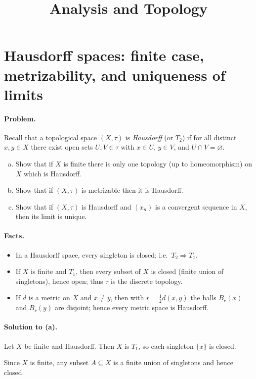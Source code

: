\documentclass[12pt,a4paper]{article}
\title{\Large Analysis and Topology}
\author{}
\date{}
\theoremstyle{plain}
\theoremstyle{definition}
\theoremstyle{remark}
\theoremstyle{remark}
\begin{document}
	
	
	\section*{Hausdorff spaces: finite case, metrizability, and uniqueness of limits}
	
	\paragraph{Problem.}
	Recall that a topological space $(X,\tau)$ is \emph{Hausdorff} (or $T_2$) if for all distinct $x,y\in X$
	there exist open sets $U,V\in\tau$ with $x\in U$, $y\in V$, and $U\cap V=\varnothing$.
	\begin{enumerate}[(a)]
		\item Show that if $X$ is finite there is only one topology (up to homeomorphism) on $X$ which is Hausdorff.
		\item Show that if $(X,\tau)$ is metrizable then it is Hausdorff.
		\item Show that if $(X,\tau)$ is Hausdorff and $(x_n)$ is a convergent sequence in $X$, then its limit is unique.
	\end{enumerate}
	
	\paragraph{Facts.}
	\begin{itemize}
		\item In a Hausdorff space, every singleton is closed; i.e.\ $T_2 \Rightarrow T_1$.
		\item If $X$ is finite and $T_1$, then every subset of $X$ is closed (finite union of singletons), hence open; thus $\tau$ is the discrete topology.
		\item If $d$ is a metric on $X$ and $x\neq y$, then with $r=\tfrac12 d(x,y)$ the balls $B_r(x)$ and $B_r(y)$ are disjoint; hence every metric space is Hausdorff.
	\end{itemize}
	
	\paragraph{Solution to (a).}
	Let $X$ be finite and Hausdorff. Then $X$ is $T_1$, so each singleton $\{x\}$ is closed.
	
	Since $X$ is finite, any subset $A\subseteq X$ is a finite union of singletons and hence closed.
	
\end{document}
